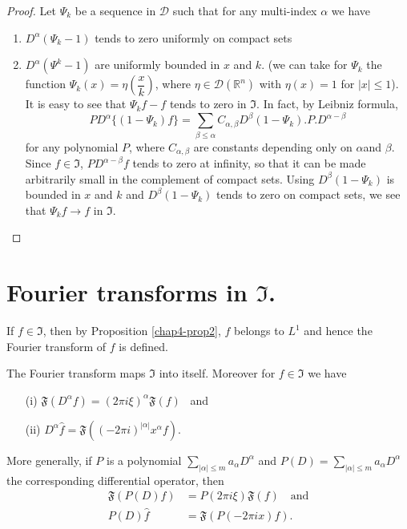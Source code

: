 \begin{proof}
Let $\Psi_{k}$ be a sequence in $\mathcal{D}$ such that for any
multi-index $\alpha$ we have
\begin{enumerate}
\renewcommand{\labelenumi}{(\theenumi)}
\item $D^{\alpha}(\Psi_{k}-1)$ tends to zero uniformly on compact sets

\item $D^{\alpha}(\Psi^{k}-1)$ are uniformly bounded in $x$ and
  $k$. (we can take for $\Psi_{k}$ the function
  $\Psi_{k}(x)=\eta\left(\dfrac{x}{k}\right)$, where $\eta\in
  \mathcal{D}(\mathbb{R}^{n})$ with $\eta(x)=1$ for $|x|\leq 1$). It
  is easy to see that $\Psi_{k}f-f$ tends to zero in
  $\mathfrak{I}$. In fact, by Leibniz formula,
$$
PD^{\alpha}\{(1-\Psi_{k})f\}=\sum\limits_{\beta\leq
  \alpha}C_{\alpha,\beta}D^{\beta}(1-\Psi_{k}). P.D^{\alpha-\beta}
$$
for any polynomial $P$, where $C_{\alpha,\beta}$ are constants
depending only on $\alpha$\pageoriginale and $\beta$. Since $f\in
\mathfrak{I}$, $PD^{\alpha-\beta}f$ tends to zero at infinity, so that
it can be made arbitrarily small in the complement of compact
sets. Using $D^{\beta}(1-\Psi_{k})$ is bounded in $x$ and $k$ and
$D^{\beta}(1-\Psi_{k})$ tends to zero on compact sets, we see that
$\Psi_{k}f\to f$ in $\mathfrak{I}$.
\end{enumerate}
\end{proof}

\section*{Fourier transforms in $\mathfrak{I}$.}

If $f\in \mathfrak{I}$, then by Proposition \ref{chap4-prop2}, $f$
belongs to $L^{1}$ and hence the Fourier transform of $f$ is defined.

\begin{proposition}\label{chap4-prop4}
The Fourier transform maps $\mathfrak{I}$ into itself. Moreover for
$f\in \mathfrak{I}$ we have
\begin{itemize}
\item[\rm(i)] $\mathfrak{F}(D^{\alpha}f)=(2\pi i
  \xi)^{\alpha}\mathfrak{F}(f)$ \ and

\item[\rm(ii)] $D^{\alpha}\widehat{f}=\mathfrak{F}((-2\pi i)^{|\alpha|}x^{\alpha}f)$.
\end{itemize}
More generally, if $P$ is a polynomial $\sum\limits_{|\alpha|\leq
  m}a_{\alpha}D^{\alpha}$ and $P(D)=\sum\limits_{|\alpha|\leq
  m}a_{\alpha}D^{\alpha}$ the corresponding differential operator,
then
\begin{align*}
\mathfrak{F}(P(D)f) &= P(2\pi
i\xi)\mathfrak{F}(f)\quad\text{and}\\[3pt]
P(D)\widehat{f} &= \mathfrak{F}(P(-2\pi ix)f).
\end{align*}
\end{proposition}

